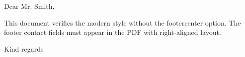 \documentclass[modern, lang=english]{../../onlinebrief24}
\begin{document}
\begin{letter}{}
\opening{Dear Mr. Smith,}

This document verifies the modern style without the footercenter option.
The footer contact fields must appear in the PDF with right-aligned layout.

\closing{Kind regards}
\end{letter}
\end{document}
